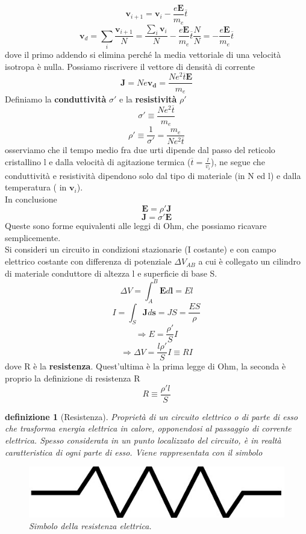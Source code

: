 \documentclass[10pt,a4paper]{article}
\newtheorem{definizione}{definizione}
\begin{document}
\[\mathbf{v}_{i+1}  = \mathbf{v}_i - \frac{e\mathbf{E}}{m_e}\overline{t}\]
\[\mathbf{v}_d = \sum_i\frac{\mathbf{v}_{i+1}}{N}= \frac{\sum_i\mathbf{v}_i}{N} - \frac{e\mathbf{E}}{m_e}\overline{t} \frac{N}{N} = - \frac{e\mathbf{E}}{m_e}\overline{t}\]
dove il primo addendo si elimina perché la media vettoriale di una velocità isotropa è nulla. Possiamo riscrivere il vettore di densità di corrente
\[\mathbf{J}= Ne\mathbf{v_d}= \frac{Ne^2\overline{t}\mathbf{E}}{m_e}\]
Definiamo la \textbf{conduttività} $\sigma'$ e la \textbf{resistività} $\rho'$
\[\sigma' \equiv \frac{Ne^2\overline{t}}{m_e}\]
\[\rho' \equiv \frac{1}{\sigma'}= \frac{m_e}{Ne^2\overline{t}}\]
osserviamo che il tempo medio fra due urti dipende dal passo del reticolo cristallino l e dalla velocità di agitazione termica (\(\overline{t}= \frac{l}{v_i}\)), ne segue che conduttività e resistività dipendono solo dal tipo di materiale (in N ed l) e dalla temperatura ( in $\mathbf{v}_i$). \\
In conclusione
\[\mathbf{E}= \rho' \mathbf{J}\]
\[\mathbf{J}= \sigma' \mathbf{E}\]
Queste sono forme equivalenti alle leggi di Ohm, che possiamo ricavare semplicemente.\\
Si consideri un circuito in condizioni stazionarie (I costante) e con campo elettrico costante con differenza di potenziale \(\Delta V_{AB}\) a cui è collegato un cilindro di materiale conduttore di altezza l e superficie di base S. 
\[\Delta V = \int_{A}^{B}\mathbf{E}d\mathbf{l}=El\]
\[I = \int_S \mathbf{J}d\mathbf{s}= JS= \frac{E S}{\rho}\]
\[\Rightarrow E = \frac{\rho'}{S}I\]
\[\Rightarrow \Delta V = \frac{l\rho'}{S}I \equiv R I\]
dove R è la \textbf{resistenza}. Quest'ultima è la prima legge di Ohm, la seconda è proprio la definizione di resistenza R
\[R \equiv \frac{\rho' l}{S}\]
\begin{definizione}[Resistenza]
Proprietà di un circuito elettrico o di parte di esso che trasforma energia elettrica in calore, opponendosi al passaggio di corrente elettrica. Spesso considerata in un punto localizzato del circuito, è in realtà caratteristica di ogni parte di esso. Viene rappresentata con il simbolo
\begin{figure}[h!]
	\centering
	\includegraphics[width=0.3\linewidth]{images/resistenza}
	\caption{Simbolo della resistenza elettrica.}
	\label{fig:resistenza}
\end{figure}
\FloatBarrier
\end{definizione}
\end{document}
